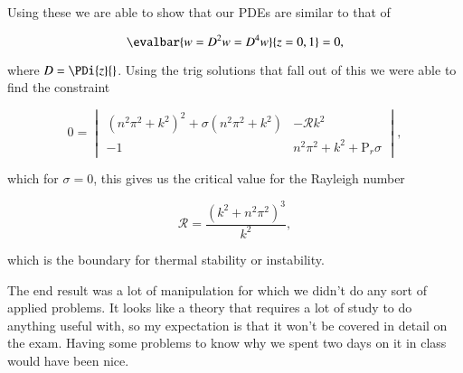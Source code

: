 Using these we are able to show that our PDEs are similar to that of

\begin{equation}\label{eqn:continuumFluidsReview:3110}
\evalbar{w = D^2 w = D^4 w}{z = 0, 1} = 0,
\end{equation}

where $D = \PDi{z}{}$.  Using the trig solutions that fall out of this we were able to find the constraint

\begin{equation}\label{eqn:continuumFluidsReview:490a}
0 =
\begin{vmatrix}
\left( n^2 \pi^2 + k^2 \right)^2 + \sigma \left( n^2 \pi^2 + k^2\right) & -\mathcal{R} k^2 \\
-1 & n^2 \pi^2 + k^2 + \text{P}_r \sigma
\end{vmatrix},
\end{equation}

which for $\sigma = 0$, this gives us the critical value for the Rayleigh number

\begin{equation}\label{eqn:continuumFluidsReview:510a}
\mathcal{R} = \frac{(k^2 + n^2 \pi^2)^3}{k^2},
\end{equation}

which is the boundary for thermal stability or instability.

The end result was a lot of manipulation for which we didn't do any sort of applied problems.  It looks like a theory that requires a lot of study to do anything useful with, so my expectation is that it won't be covered in detail on the exam.  Having some problems to know why we spent two days on it in class would have been nice.

